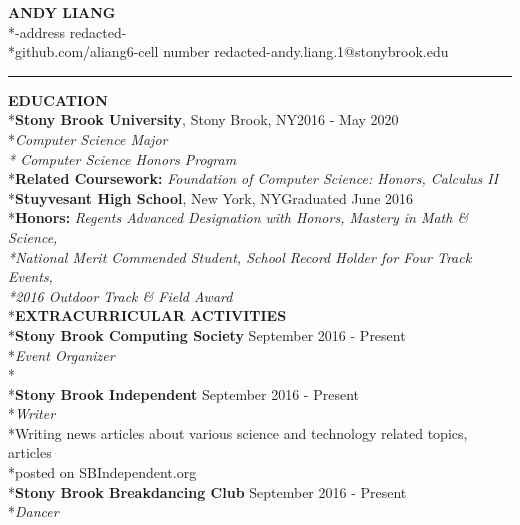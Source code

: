 \documentclass[11pt]{letter}
\begin{document}
\begin{center}
\LARGE\textbf{ANDY LIANG}
\bigskip
\normalsize\\*-address redacted-
\smallskip
\\*github.com/aliang6\hspace{0.25cm}\textbar\hspace{0.25cm}-cell number redacted-\hspace{0.25cm}\textbar\hspace{0.25cm}andy.liang.1@stonybrook.edu
\rule{\textwidth}{1pt}
\end{center}

\begin{flushleft}
\vspace{-4mm}\large\textbf{EDUCATION}
\\*\normalsize\textbf{Stony Brook University}, Stony Brook, NY\hfill2016 - May 2020
\\*\textit{Computer Science Major \\* Computer Science Honors Program}
\\*\textbf{Related Coursework: }\textit{Foundation of Computer Science: Honors, Calculus II}
\medskip
\\*\textbf{Stuyvesant High School}, New York, NY\hfill Graduated June 2016
\\*\textbf{Honors: }\textit{Regents Advanced Designation with Honors, Mastery in Math \& Science,\\*National Merit Commended Student, School Record Holder for Four Track Events,\\*2016 Outdoor Track \& Field Award}
\vspace{7.5mm}
\\*\textbf{EXTRACURRICULAR ACTIVITIES}
\\*\textbf{Stony Brook Computing Society} \hfill September 2016 - Present
\\*\textit{Event Organizer}
\\*
\\*\textbf{Stony Brook Independent} \hfill September 2016 - Present
\\*\textit{Writer}
\\*\qquad Writing news articles about various science and technology related topics, articles
\\*\qquad posted on SBIndependent.org
\\*\textbf{Stony Brook Breakdancing Club} \hfill September 2016 - Present
\\*\textit{Dancer}

\end{flushleft}
\end{document}
